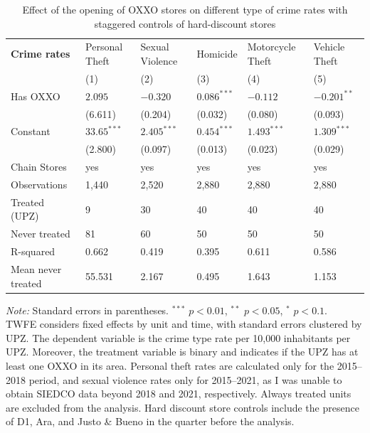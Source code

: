 \documentclass[12pt]{article}
\begin{document}
\begin{table}[H]
\centering
\caption{Effect of the opening of OXXO stores on different type of crime rates with staggered controls of hard-discount stores}
\label{tab:resultados_regresion_hd}
\small


\begin{tabularx}{\textwidth}{l C C C C C}
\hline\hline
\textbf{Crime rates} & Personal Theft & Sexual Violence & Homicide & Motorcycle Theft & Vehicle Theft \\
 & (1) & (2) & (3) & (4) & (5) \\
\hline
Has OXXO & $2.095$         & $-0.320$    & $0.086^{***}$    & $-0.112$      & $-0.201^{**}$  \\
         & (6.611)       & (0.204)       & (0.032)          & (0.080)       & (0.093) \\
Constant & $33.65^{***}$ & $2.405^{***}$ & $0.454^{***}$    & $1.493^{***}$ & $1.309^{***}$ \\
         & (2.800)       & (0.097)       & (0.013)          & (0.023)       & (0.029) \\
\hline
Chain Stores       & yes   & yes   & yes   & yes   & yes \\
Observations       & 1,440 & 2,520 & 2,880 & 2,880 & 2,880 \\
Treated (UPZ)      & 9     & 30    & 40    & 40    & 40 \\
Never treated      & 81    & 60    & 50    & 50    & 50 \\
R-squared          & 0.662 & 0.419 & 0.395 & 0.611 & 0.586 \\
Mean never treated & 55.531& 2.167 & 0.495 & 1.643 & 1.153 \\
\hline\hline
\end{tabularx}

\vspace{0.5em}
\parbox{\textwidth}{\footnotesize
    \textit{Note:} Standard errors in parentheses. $^{***}$ $p<0.01$, $^{**}$ $p<0.05$, $^{*}$ $p<0.1$. \\
    TWFE considers fixed effects by unit and time, with standard errors clustered by UPZ. 
    The dependent variable is the crime type rate per 10,000 inhabitants per UPZ. 
    Moreover, the treatment variable is binary and indicates if the UPZ has at least one OXXO in its area. 
    Personal theft rates are calculated only for the 2015–2018 period, and sexual violence rates only for 2015–2021, as I was unable to obtain SIEDCO data beyond 2018 and 2021, respectively.
    Always treated units are excluded from the analysis.
    Hard discount store controls include the presence of D1, Ara, and Justo \& Bueno in the quarter before the analysis.
}
\end{table}
\end{document}
